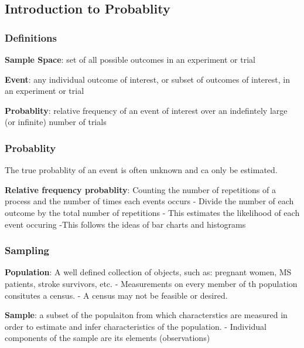 \documentclass[12pt,]{article}
\begin{document}
\hypertarget{htmlwidget-0b4418012763d828a34d}{}

\hypertarget{introduction-to-probablity}{%
\subsection{Introduction to
Probablity}\label{introduction-to-probablity}}

\hypertarget{definitions}{%
\subsubsection{Definitions}\label{definitions}}

\textbf{Sample Space}: set of all possible outcomes in an experiment or
trial

\textbf{Event}: any individual outcome of interest, or subset of
outcomes of interest, in an experiment or trial

\textbf{Probablity}: relative frequency of an event of interest over an
indefintely large (or infinite) number of trials

\hypertarget{probablity}{%
\subsubsection{Probablity}\label{probablity}}

The true probablity of an event is often unknown and ca only be
estimated.

\textbf{Relative frequency probablity}: Counting the number of
repetitions of a process and the number of times each events occurs -
Divide the number of each outcome by the total number of repetitions -
This estimates the likelihood of each event occuring -This follows the
ideas of bar charts and histograms

\hypertarget{sampling}{%
\subsubsection{Sampling}\label{sampling}}

\textbf{Population}: A well defined collection of objects, such as:
pregnant women, MS patients, stroke survivors, etc. - Measurements on
every member of th population consitutes a census. - A census may not be
feasible or desired.

\textbf{Sample}: a subset of the populaiton from which characterstics
are measured in order to estimate and infer characteristics of the
population. - Individual components of the sample are its elements
(observations)
\end{document}
